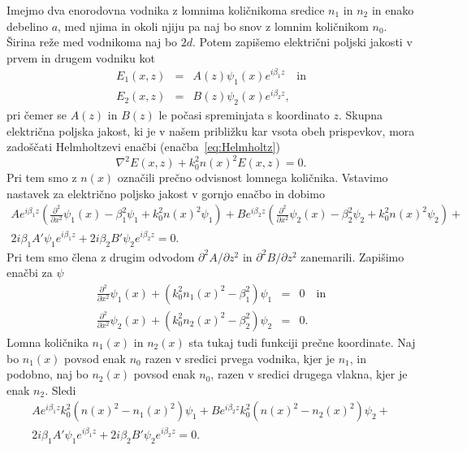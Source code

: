 Imejmo dva enorodovna vodnika z lomnima količnikoma sredice $n_1$ in $n_2$ in enako 
debelino $a$, med njima in okoli njiju pa naj bo snov z lomnim količnikom $n_0$. Širina 
reže med vodnikoma naj bo $2d$.
Potem zapišemo električni poljski jakosti v prvem in drugem vodniku kot
\begin{eqnarray}
E_1(x,z) &=& A(z) \psi_1(x) e^{i \beta_1 z} \quad \mathrm{in}\\
E_2(x,z) &=& B(z) \psi_2(x) e^{i \beta_2 z},
\label{eq:10_ampl}
\end{eqnarray}
pri čemer se $A(z)$ in $B(z)$ le počasi spreminjata s koordinato $z$. Skupna električna poljska
jakost, ki je v našem približku kar vsota obeh prispevkov, mora zadoščati Helmholtzevi enačbi
(enačba~\ref{eq:Helmholtz})
\begin{equation}
\nabla^{2}E(x,z)+k_0^{2}n(x)^2 E(x,z) =0.
\end{equation}
Pri tem smo z $n(x)$ označili prečno odvisnost lomnega količnika.
Vstavimo nastavek za električno poljsko jakost v gornjo enačbo in dobimo
\begin{multline}
A e^{i \beta_1 z}\left(\frac{\partial^2}{\partial x^2}\psi_1(x) - \beta_1^2\psi_1 + k_0^2
n(x)^2 \psi_1 \right)
+ 
B e^{i \beta_2 z}\left(\frac{\partial^2}{\partial x^2}\psi_2(x) - \beta_2^2\psi_2 + k_0^2
n(x)^2 \psi_2 \right)+ \\2 i \beta_1 A' \psi_1 e^{i \beta_1 z}+
2 i \beta_2 B' \psi_2 e^{i \beta_2 z} = 0.
\end{multline}
Pri tem smo člena z drugim odvodom $\partial^2 A/\partial z^2$ in $\partial^2 B/\partial z^2$
zanemarili. Zapišimo enačbi za $\psi$
\begin{eqnarray}
\frac{\partial^2}{\partial x^2}\psi_1(x) + \left(k_0^2n_1(x)^2-\beta_1^2\right) \psi_1 &=&0 \quad \mathrm{in} \\
\frac{\partial^2}{\partial x^2}\psi_2(x) + \left(k_0^2n_2(x)^2-\beta_2^2\right) \psi_2 &=&0.
\end{eqnarray}
Lomna količnika $n_1(x)$ in $n_2(x)$ sta tukaj tudi funkciji prečne koordinate. Naj bo $n_1(x)$  
povsod enak $n_0$ razen v sredici prvega vodnika, kjer je $n_1$, in podobno, naj bo 
$n_2(x)$ povsod enak $n_0$, razen v sredici drugega vlakna, kjer je enak $n_2$. Sledi
\begin{multline}
A e^{i \beta_1 z}k_0^2\left(n(x)^2 -n_1(x)^2\right)\psi_1 
+ 
B e^{i \beta_2 z}k_0^2\left(n(x)^2 -n_2(x)^2\right)\psi_2 + \\2 i \beta_1 A' \psi_1 e^{i \beta_1 z}+
2 i \beta_2 B' \psi_2 e^{i \beta_2 z} = 0.
\end{multline}
